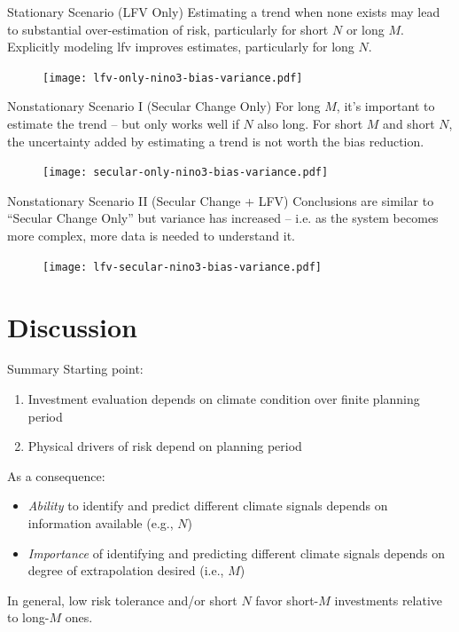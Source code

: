\documentclass[
  10pt,     %
  handout   %
]{beamer}
\makeatletter
\newcommand*{\eg}{e.g.\@\xspace}
\newcommand*{\ie}{i.e.\@\xspace}
\makeatother
\begin{document}
\begin{frame}{Stationary Scenario (LFV Only)}
  Estimating a trend when none exists may lead to substantial over-estimation of risk, particularly for short $N$ or long $M$.
  Explicitly modeling \gls{lfv} improves estimates, particularly for long $N$.
  \begin{figure}
    \centering
    \texttt{[image: lfv-only-nino3-bias-variance.pdf]}
  \end{figure}
\end{frame}

\begin{frame}{Nonstationary Scenario I (Secular Change Only)}
  For long $M$, it's important to estimate the trend -- but only works well if $N$ also long.
  For short $M$ and short $N$, the uncertainty added by estimating a trend is not worth the bias reduction.
  \begin{figure}
    \centering
    \texttt{[image: secular-only-nino3-bias-variance.pdf]}
  \end{figure}
\end{frame}

\begin{frame}{Nonstationary Scenario II (Secular Change + LFV)}
  Conclusions are similar to ``Secular Change Only'' but variance has increased -- \ie as the system becomes more complex, more data is needed to understand it.
  \begin{figure}
    \centering
    \texttt{[image: lfv-secular-nino3-bias-variance.pdf]}
  \end{figure}
\end{frame}

\section{Discussion}

\begin{frame}{Summary}
  Starting point:
  \begin{enumerate}
    \item Investment evaluation depends on climate condition over finite planning period
    \item Physical drivers of risk depend on planning period
  \end{enumerate}
  \pause
  As a consequence:
  \begin{itemize}
    \item \emph{Ability} to identify and predict different climate signals depends on information available (\eg, $N$)
    \item \emph{Importance} of identifying and predicting different climate signals depends on degree of extrapolation desired (\ie, $M$)
  \end{itemize}
  \pause
  In general, low risk tolerance and/or short $N$ favor short-$M$ investments relative to long-$M$ ones.
\end{frame}
\end{document}
